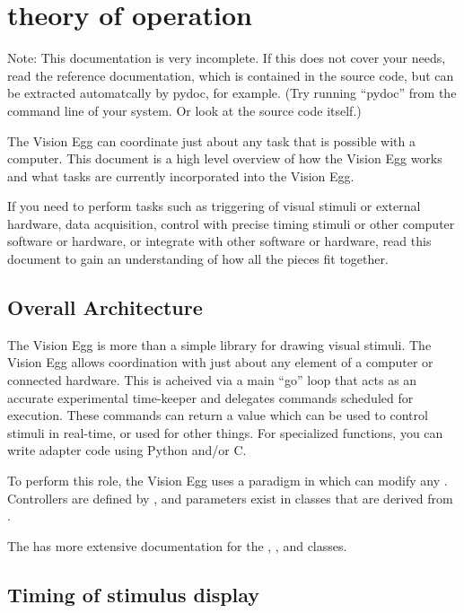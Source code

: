 \chapter{theory of operation \label{theory}}

Note: This documentation is very incomplete.  If this does not cover
your needs, read the reference documentation, which is contained in
the source code, but can be extracted automatcally by pydoc, for
example.  (Try running ``pydoc'' from the command line of your
system. Or look at the source code itself.)

The Vision Egg can coordinate just about any task that is possible
with a computer.  This document is a high level overview of how the
Vision Egg works and what tasks are currently incorporated into the
Vision Egg.

If you need to perform tasks such as triggering of visual stimuli or
external hardware, data acquisition, control with precise timing
stimuli or other computer software or hardware, or integrate with
other software or hardware, read this document to gain an
understanding of how all the pieces fit together.

\section{Overall Architecture}

The Vision Egg is more than a simple library for drawing visual
stimuli. The Vision Egg allows coordination with just about any
element of a computer or connected hardware.  This is acheived via a
main ``go'' loop that acts as an accurate experimental time-keeper and
delegates commands scheduled for execution.  These commands can return
a value which can be used to control stimuli in real-time, or used for
other things. For specialized functions, you can write adapter code
using Python and/or C.

To perform this role, the Vision Egg uses a paradigm in which
 can modify any . Controllers are
defined by , and parameters exist in classes that
are derived from .

The  has more extensive documentation for
the , , and
 classes.

\section{Timing of stimulus display}

